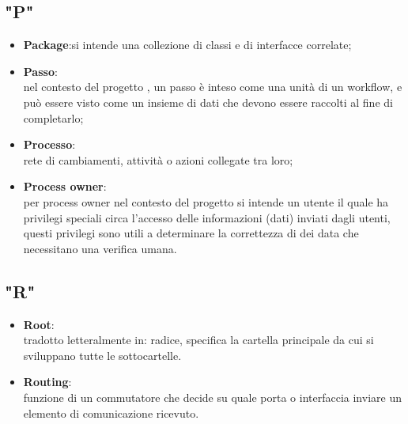 \subsection{"P"}
\begin{itemize}
\item \textbf{Package}:si intende una collezione di classi e di interfacce correlate;
\item \textbf{Passo}:\\ nel contesto del progetto \progetto{}, un passo è inteso come una unità di un workflow, e può essere visto come un insieme di dati che devono essere raccolti al fine di completarlo;
\item \textbf{Processo}:\\ rete di cambiamenti, attività o azioni collegate tra loro;
\item \textbf{Process owner}:\\ per process owner nel contesto del progetto si intende un utente il quale ha privilegi speciali circa l'accesso delle informazioni (dati) inviati dagli utenti, questi privilegi sono utili a determinare la correttezza di dei data che necessitano una verifica umana.
\end{itemize}
\subsection{"R"}
\begin{itemize}
\item \textbf{Root}:\\ tradotto letteralmente in: radice, specifica la cartella principale da cui si sviluppano tutte le sottocartelle.
\item \textbf{Routing}:\\ funzione di un commutatore che decide su quale porta o interfaccia inviare un elemento di comunicazione ricevuto.
\end{itemize}
